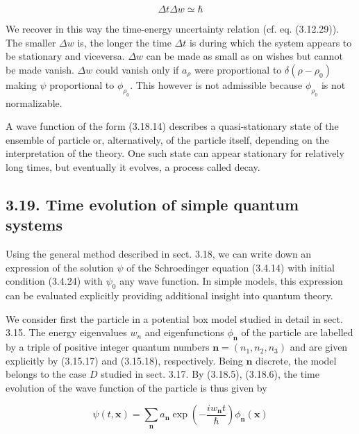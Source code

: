 \documentclass{article}
\begin{document}
\begin{equation*}
\Delta t \Delta w \simeq \hbar \tag{3.18.15}
\end{equation*}
 

We recover in this way the time-energy uncertainty relation (cf. eq. (3.12.29)). The smaller $\Delta w$ is, the longer the time $\Delta t$ is during which the system appears to
be stationary and viceversa. $\Delta w$ can be made as small as on wishes but cannot be made vanish. $\Delta w$ could vanish only if $a_{\rho}$ were proportional to $\delta\left(\rho-\rho_{0}\right)$ making $\psi$ proportional to $\phi_{\rho_{0}}$. This however is not admissible because $\phi_{\rho_{0}}$ is not normalizable.

A wave function of the form (3.18.14) describes a quasi-stationary state of the ensemble of particle or, alternatively, of the particle itself, depending on the interpretation of the theory. One such state can appear stationary for relatively long times, but eventually it evolves, a process called decay.

\subsection*{3.19. Time evolution of simple quantum systems}

Using the general method described in sect. 3.18, we can write down an expression of the solution $\psi$ of the Schroedinger equation (3.4.14) with initial condition (3.4.24) with $\psi_{0}$ any wave function. In simple models, this expression can be evaluated explicitly providing additional insight into quantum theory.

We consider first the particle in a potential box model studied in detail in sect. 3.15. The energy eigenvalues $w_{n}$ and eigenfunctions $\phi_{\boldsymbol{n}}$ of the particle are labelled by a triple of positive integer quantum numbers $\boldsymbol{n}=\left(n_{1}, n_{2}, n_{3}\right)$ and are given explicitly by (3.15.17) and (3.15.18), respectively. Being $\boldsymbol{n}$ discrete, the model belongs to the case $D$ studied in sect. 3.17. By (3.18.5), (3.18.6), the time evolution of the wave function of the particle is thus given by
 
\begin{equation*}
\psi(t, \boldsymbol{x})=\sum_{\boldsymbol{n}} a_{\boldsymbol{n}} \exp \left(-\frac{i w_{\boldsymbol{n}} t}{\hbar}\right) \phi_{\boldsymbol{n}}(\boldsymbol{x}) \tag{3.19.1}
\end{equation*}
 
\end{document}
